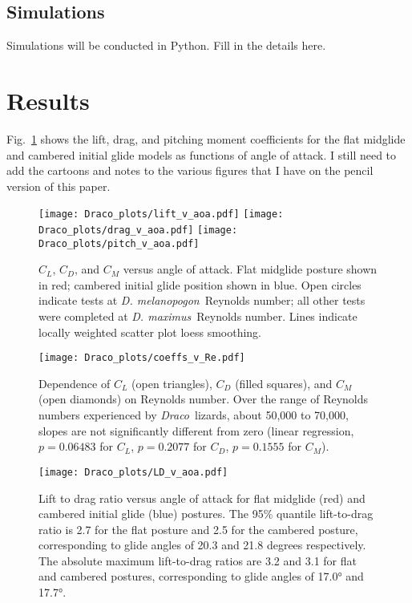 \documentclass[10pt]{article}
\newcommand{\Draco}{\emph{Draco}}
\newcommand{\Dmelanopogon}{\emph{D. melanopogon}}
\newcommand{\Dmaximus}{\emph{D. maximus}}
\begin{document}
\subsection{Simulations}
Simulations will be conducted in Python.  Fill in the details here. 

\section{Results}
Fig.~\ref{fig:lift_aoa} shows the lift, drag, and pitching moment coefficients for the flat midglide and cambered initial glide models as functions of angle of attack.  I still need to add the cartoons and notes to the various figures that I have on the pencil version of this paper. 

\begin{figure}
\texttt{[image: Draco\_plots/lift\_v\_aoa.pdf]} 
\texttt{[image: Draco\_plots/drag\_v\_aoa.pdf]} 
\texttt{[image: Draco\_plots/pitch\_v\_aoa.pdf]} 
\caption{$C_L$, $C_D$, and $C_M$ versus angle of attack.  Flat midglide posture shown in red; cambered initial glide position shown in blue.  Open circles indicate tests at \Dmelanopogon\ Reynolds number; all other tests were completed at \Dmaximus\ Reynolds number.  Lines indicate locally weighted scatter plot loess smoothing.}
\label{fig:lift_aoa}
\end{figure}

\begin{figure}
\texttt{[image: Draco\_plots/coeffs\_v\_Re.pdf]}
\caption{Dependence of $C_L$ (open triangles), $C_D$ (filled squares), and $C_M$ (open diamonds) on Reynolds number.  Over the range of Reynolds numbers experienced by \Draco\ lizards, about 50,000 to 70,000, slopes are not significantly different from zero (linear regression, $p=0.06483$ for $C_L$, $p=0.2077$ for $C_D$, $p=0.1555$ for $C_M$).}
\label{fig:coeffs_Re}
\end{figure}

\begin{figure}
\texttt{[image: Draco\_plots/LD\_v\_aoa.pdf]}
\caption{Lift to drag ratio versus angle of attack for flat midglide (red) and cambered initial glide (blue) postures.  The 95\% quantile lift-to-drag ratio is 2.7 for the flat posture and 2.5 for the cambered posture, corresponding to glide angles of 20.3 and 21.8 degrees respectively.  The absolute maximum lift-to-drag ratios are 3.2 and 3.1 for flat and cambered postures, corresponding to glide angles of \ang{17.0} and \ang{17.7}.}
\label{fig:LD_v_aoa}
\end{figure}
\end{document}

